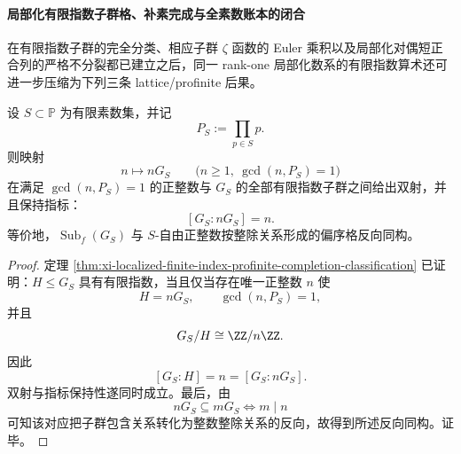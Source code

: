 \paragraph{局部化有限指数子群格、补素完成与全素数账本的闭合}
在有限指数子群的完全分类、相应子群 \(\zeta\) 函数的 Euler 乘积以及局部化对偶短正合列的严格不分裂都已建立之后，同一 rank-one 局部化数系的有限指数算术还可进一步压缩为下列三条 lattice/profinite 后果。

\begin{theorem}[局部化数系有限指数子群格的指标保持分类]\label{thm:xi-time-part56e-localized-finite-index-lattice-classification}
设 \(S\subset \mathbb P\) 为有限素数集，并记
\[
P_S:=\prod_{p\in S}p.
\]
则映射
\[
n\longmapsto nG_S
\qquad
\bigl(n\ge 1,\ \gcd(n,P_S)=1\bigr)
\]
在满足 \(\gcd(n,P_S)=1\) 的正整数与 \(G_S\) 的全部有限指数子群之间给出双射，并且保持指标：
\[
[G_S:nG_S]=n.
\]
等价地，\(\operatorname{Sub}_f(G_S)\) 与 \(S\)-自由正整数按整除关系形成的偏序格反向同构。
\end{theorem}
\begin{proof}
定理 \ref{thm:xi-localized-finite-index-profinite-completion-classification} 已证明：\(H\le G_S\) 具有有限指数，当且仅当存在唯一正整数 \(n\) 使
\[
H=nG_S,
\qquad
\gcd(n,P_S)=1,
\]
并且
\[
G_S/H\cong \ZZ/n\ZZ.
\]
因此
\[
[G_S:H]=n=[G_S:nG_S].
\]
双射与指标保持性遂同时成立。最后，由
\[
nG_S\subseteq mG_S
\iff
m\mid n
\]
可知该对应把子群包含关系转化为整数整除关系的反向，故得到所述反向同构。证毕。
\end{proof}

